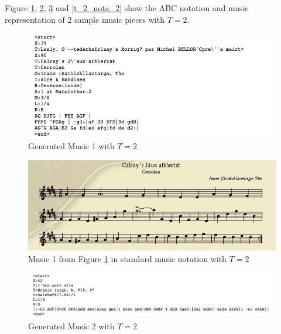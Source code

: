 \documentclass{article}
\begin{document}
Figure \ref{t_2_1}, \ref{t_2_nota_1}, \ref{t_2_2} and \ref{t_2_nota_2} show the ABC notation and music representation of $2$ sample music pieces with $T=2$.

\begin{figure}[H]
\begin{center}
  \centering
  \includegraphics[width=5in]{image/t_2_1.png}
\end{center}
\caption{Generated Music 1 with $T=2$}
\label{t_2_1}
\end{figure}

\begin{figure}[H]
\begin{center}
  \centering
  \includegraphics[width=4.5in]{image/t_2_1_nota.png}
\end{center}
\caption{Music 1 from Figure \ref{t_2_1} in standard music notation with $T=2$}
\label{t_2_nota_1}
\end{figure}

\begin{figure}[H]
\begin{center}
  \centering
  \includegraphics[width=5in]{image/t_2_2.png}
\end{center}
\caption{Generated Music 2 with $T=2$}
\label{t_2_2}
\end{figure}
\end{document}
